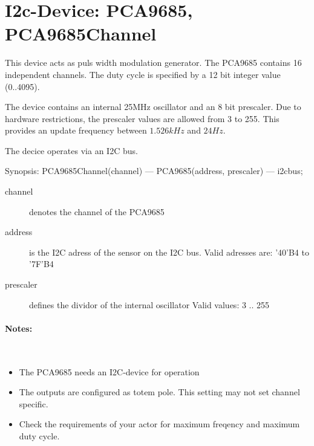 \section{I2c-Device: PCA9685, PCA9685Channel}
This device acts as puls width modulation generator.
The PCA9685 contains 16 independent channels. The duty cycle
is specified by a 12 bit integer value (0..4095).

The device contains an internal 25MHz oscillator and an 8 bit
prescaler. Due to hardware restrictions, the prescaler values are
allowed from 3 to 255. This provides an update frequency between
$1.526 kHz$ and $24 Hz$.

The decice operates via an I2C bus. 

Synopsis: PCA9685Channel(channel) --- PCA9685(address, prescaler) --- i2cbus; \\

\begin{description}
\item[channel] denotes the channel of the PCA9685
\item[address] is the I2C adress of the sensor on the I2C bus.
   Valid adresses are: '40'B4 to '7F'B4
\item[prescaler] defines the dividor of the internal oscillator
   Valid values: 3 .. 255
\end{description}

\paragraph{Notes:}\ 
\begin{itemize}
\item The PCA9685 needs an I2C-device for operation
\item The outputs are configured as totem pole. This 
    setting may not set channel specific.
\item Check the requirements of your actor for maximum freqency
    and maximum duty cycle.
\end{itemize}

